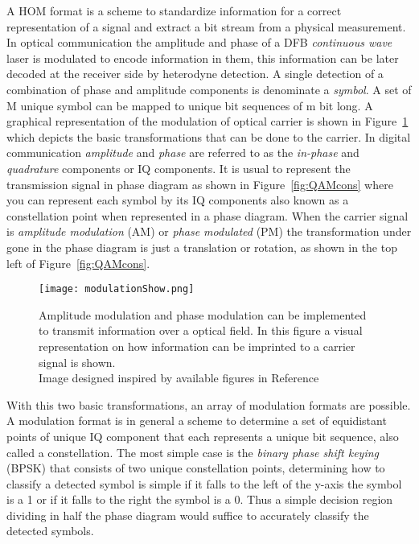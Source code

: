  
 A HOM format is a scheme to standardize information for a correct representation of a signal and extract a bit stream from a physical measurement. In optical communication the amplitude and phase of a DFB \textit{continuous wave} laser is modulated to encode information in them, this information can be later decoded at the receiver side by heterodyne detection. A single detection of a combination of phase and amplitude components is denominate a \textit{symbol}. A set of M unique symbol can be mapped to unique bit sequences of m bit long. A graphical representation of the modulation  of  optical carrier is shown in Figure~\ref{fig:AmPm} which depicts the basic transformations that can be done to the carrier. In digital communication  \textit{amplitude} and \textit{phase} are referred to as the \textit{in-phase} and \textit{quadrature} components or IQ components. It is usual to represent the transmission signal in phase diagram as shown in Figure~\ref{fig:QAMcons} where you can represent each symbol by its IQ components also known as a constellation point when represented in a phase diagram. When the carrier signal is  \textit{amplitude modulation} (AM) or \textit{phase modulated} (PM) the transformation under gone in the phase diagram is just a translation or rotation, as shown in the top left of Figure~\ref{fig:QAMcons}.
 
  \begin{figure}[h]
 \centering
 \texttt{[image: modulationShow.png]}
 \caption{Amplitude modulation and phase modulation can be implemented to transmit information over a optical field. In this figure a visual representation on how information can be imprinted to a carrier signal is shown.\\ {\scriptsize Image designed inspired by available figures in Reference~\cite{FundPhoto} } }
 \label{fig:AmPm}
 \end{figure}
 With this two basic transformations, an array of modulation formats are possible. A modulation format is in general a scheme to determine a set of equidistant points of unique IQ component that each represents a unique bit sequence, also called a constellation. The most simple case is the \textit{binary phase shift keying} (BPSK) that consists of two unique constellation points, determining how to classify a detected symbol is simple if it falls to the left of the y-axis the symbol is a 1 or if it falls to the right the symbol is a 0. Thus a simple decision region dividing in half the phase diagram would suffice to accurately classify the detected symbols.
 
